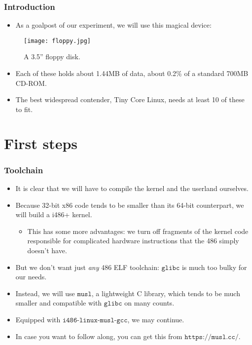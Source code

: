 \documentclass{beamer}
\begin{document}
\begin{frame}[t]
\frametitle{Introduction}
\begin{itemize}
  \item As a goalpost of our experiment, we will use this magical device:
\end{itemize}
\begin{figure}
  \centering
  \texttt{[image: floppy.jpg]}
  \caption{A 3.5'' floppy disk.}
\end{figure}
\begin{itemize}
  \item Each of these holds about 1.44MB of data, about 0.2\% of a standard 700MB CD-ROM.
  \item The best widespread contender, Tiny Core Linux, needs at least 10 of these to fit.
\end{itemize}
\end{frame}

\section{First steps}
\begin{frame}[t]
\frametitle{Toolchain}
\begin{itemize}
  \item It is clear that we will have to compile the kernel and the userland ourselves.
  \item Because 32-bit x86 code tends to be smaller than its 64-bit counterpart, we will build a i486+ kernel.
  \begin{itemize} \item This has some more advantages: we turn off fragments of the kernel code responsible for complicated hardware instructions that the 486 simply doesn't have. \end{itemize}
  \item But we don't want just \textit{any} 486 ELF toolchain: $\texttt{glibc}$ is much too bulky for our needs.
  \item Instead, we will use $\texttt{musl}$, a lightweight C library, which tends to be much smaller and compatible with $\texttt{glibc}$ on many counts.
  \item Equipped with $\texttt{i486-linux-musl-gcc}$, we may continue.
  \item In case you want to follow along, you can get this from $\texttt{https://musl.cc/}$.
\end{itemize}
\end{frame}
\end{document}
